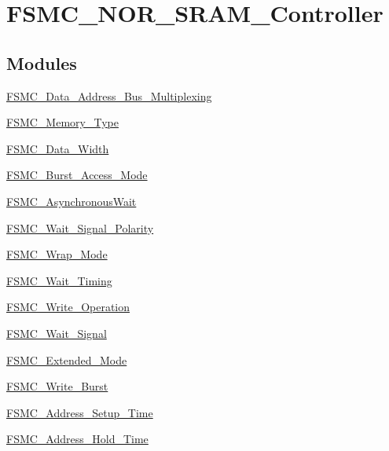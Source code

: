 \hypertarget{group___f_s_m_c___n_o_r___s_r_a_m___controller}{\section{F\-S\-M\-C\-\_\-\-N\-O\-R\-\_\-\-S\-R\-A\-M\-\_\-\-Controller}
\label{group___f_s_m_c___n_o_r___s_r_a_m___controller}
}
\subsection*{Modules}
\begin{DoxyCompactItemize}
\item 
\hyperlink{group___f_s_m_c___data___address___bus___multiplexing}{F\-S\-M\-C\-\_\-\-Data\-\_\-\-Address\-\_\-\-Bus\-\_\-\-Multiplexing}
\item 
\hyperlink{group___f_s_m_c___memory___type}{F\-S\-M\-C\-\_\-\-Memory\-\_\-\-Type}
\item 
\hyperlink{group___f_s_m_c___data___width}{F\-S\-M\-C\-\_\-\-Data\-\_\-\-Width}
\item 
\hyperlink{group___f_s_m_c___burst___access___mode}{F\-S\-M\-C\-\_\-\-Burst\-\_\-\-Access\-\_\-\-Mode}
\item 
\hyperlink{group___f_s_m_c___asynchronous_wait}{F\-S\-M\-C\-\_\-\-Asynchronous\-Wait}
\item 
\hyperlink{group___f_s_m_c___wait___signal___polarity}{F\-S\-M\-C\-\_\-\-Wait\-\_\-\-Signal\-\_\-\-Polarity}
\item 
\hyperlink{group___f_s_m_c___wrap___mode}{F\-S\-M\-C\-\_\-\-Wrap\-\_\-\-Mode}
\item 
\hyperlink{group___f_s_m_c___wait___timing}{F\-S\-M\-C\-\_\-\-Wait\-\_\-\-Timing}
\item 
\hyperlink{group___f_s_m_c___write___operation}{F\-S\-M\-C\-\_\-\-Write\-\_\-\-Operation}
\item 
\hyperlink{group___f_s_m_c___wait___signal}{F\-S\-M\-C\-\_\-\-Wait\-\_\-\-Signal}
\item 
\hyperlink{group___f_s_m_c___extended___mode}{F\-S\-M\-C\-\_\-\-Extended\-\_\-\-Mode}
\item 
\hyperlink{group___f_s_m_c___write___burst}{F\-S\-M\-C\-\_\-\-Write\-\_\-\-Burst}
\item 
\hyperlink{group___f_s_m_c___address___setup___time}{F\-S\-M\-C\-\_\-\-Address\-\_\-\-Setup\-\_\-\-Time}
\item 
\hyperlink{group___f_s_m_c___address___hold___time}{F\-S\-M\-C\-\_\-\-Address\-\_\-\-Hold\-\_\-\-Time}

\end{DoxyCompactItemize}
